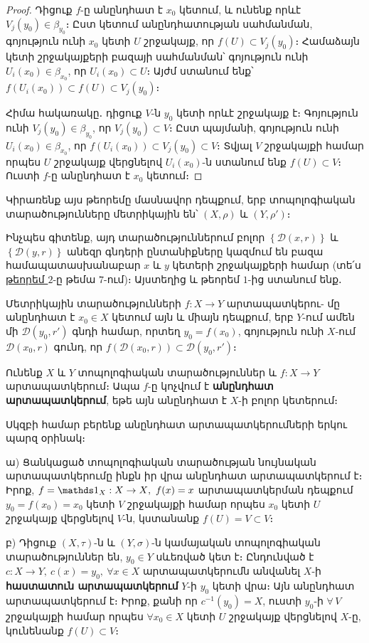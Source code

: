 \documentclass[./main.tex]{subfiles}
\begin{document}
\begin{proof} Դիցուք $f$-ը անընդհատ է $x_0$ կետում, և ունենք որևէ $V_j(y_0)\in \beta_{y_0}$։ Ըստ կետում անընդհատության սահմանման, գոյություն ունի $x_0$ կետի $U$ շրջակայք, որ $f(U)\subset V_j(y_0)$։ Համաձայն կետի շրջակայքերի բազայի սահմանման՝ գոյություն ունի $U_i(x_0)\in \beta_{x_0}$, որ $U_i(x_0)\subset U$։ Այժմ ստանում ենք՝ $f(U_i(x_0))\subset f(U)\subset V_j(y_0 )$։
\par Հիմա հակառակը․ դիցուք $V$-ն $y_0$ կետի որևէ շրջակայք է։ Գոյություն ունի $V_j(y_0)\in \beta_{y_0}$, որ $V_j(y_0)\subset V$։ Ըստ պայմանի, գոյություն ունի $U_i(x_0)\in \beta_{x_0}$, որ $f(U_i(x_0))\subset V_j(y_0)\subset V$։ Տվյալ $V$ շրջակայքի համար որպես $U$ շրջակայք վերցնելով $U_i(x_0)$-ն ստանում ենք $f(U)\subset V$։ Ուստի $f$-ը անընդհատ է $x_0$ կետում։ 
\end{proof}
\par Կիրառենք այս թեորեմը մասնավոր դեպքում, երբ տոպոլոգիական տարածու\-թյունները մետրիկային են՝ $(X,\rho)$ և $(Y,\rho')$։
\par Ինչպես գիտենք, այդ տարածություններում բոլոր $\left\{\mathcal{D}(x,r)\right\}$ և $\left\{\mathcal{D}(y,r)\right\}$ անեզր գնդերի ընտանիքները կազմում են բազա համապատասխանաբար $x$ և $y$ կետերի շրջակայքերի համար (տե՛ս \hyperref[ch7thm2]{թեորեմ $2$}-ը թեմա $7$-ում)։ Այստեղից և թեորեմ $1$-ից ստանում ենք․

\begin{hetevanq}\label{ch9cor1} 
Մետրիկային տարածությունների $f:X \rightarrow Y$ արտապատկերու- \linebreak մը անընդհատ է ${x_0\in X}$ կետում այն և միայն դեպքում, երբ $Y$-ում ամեն մի \linebreak $\mathcal{D}(y_0,{r'})$ գնդի համար, որտեղ ${y_0=f(x_0)}$, գոյություն ունի $X$-ում $\mathcal{D}(x_0,r)$ գունդ, որ $f(\mathcal{D}(x_0,r))\subset \mathcal{D}(y_0,{r'})$։ 
\end{hetevanq}

\begin{definition}
Ունենք $X$ և $Y$ տոպոլոգիական տարածություններ և $f:X  \rightarrow  Y$ արտա\-պատկերում։ Ապա $f$-ը կոչվում է \textbf{անընդհատ արտապատկերում}, եթե այն անընդ\-հատ է $X$-ի բոլոր կետերում։
\end{definition}
Սկզբի համար բերենք անընդհատ արտապատկերումների երկու պարզ օրինակ։
\par ա) Ցանկացած տոպոլոգիական տարածության նույնական արտապատկերումը ինքն իր վրա անընդհատ արտապատկերում է։ Իրոք, ${f=\nuynakan_X:X  \rightarrow  X},\ f(x)=x$ արտա\-պատ\-կեր\-ման դեպքում $y_0=f(x_0)=x_0$ կետի $V$ շրջակայքի համար որպես $x_0$ կետի $U$ շրջակայք վերցնելով $V$-ն, կստանանք $f(U)=V\subset V$։ 
\par բ) Դիցուք $(X,\tau)$-ն և $(Y,\sigma )$-ն կամայական տոպոլոգիական տարածություններ են, $y_0\in Y$ սևեռված կետ է։ Ընդունված է $c:X  \rightarrow Y,\ c(x)=y_0,\ \forall x\in X$ արտա\-պատ\-կե\-րումն անվանել $X$-ի \textbf{հաստատուն արտապատկերում} $Y$-ի $y_0$ կետի վրա։ Այն անընդհատ արտապատ\-կերում է։ Իրոք, քանի որ $c^{-1}(y_0)=X$, ուստի $y_0$-ի $\forall\, V$ շրջակայքի համար որպես $ \forall x_0\in X$ կետի $U$ շրջակայք վերցնելով $X$-ը, կունենանք $f(U)\subset V$։
\end{document}
